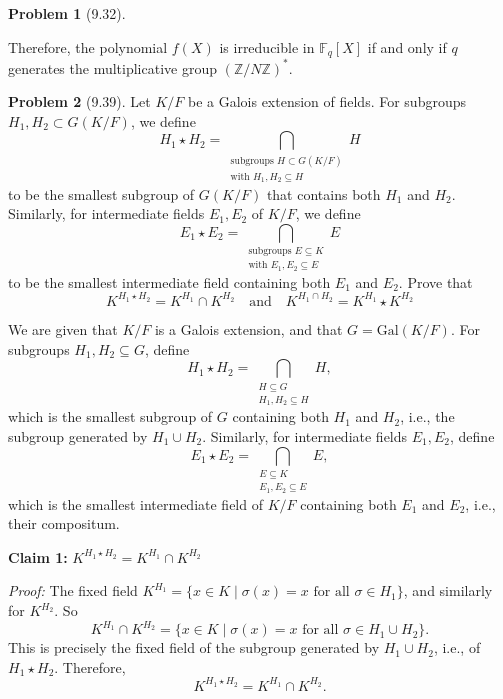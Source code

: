 \documentclass[12pt]{article}
\theoremstyle{definition}
\newtheorem{problem}{Problem}
\begin{document}
\begin{problem}[9.32]
\begin{enumerate}[label=(\alph*)]
\begin{solution}
            Therefore, the polynomial $f(X)$ is irreducible in $\mathbb{F}_q[X]$ if and only if $q$ generates the multiplicative group $(\mathbb{Z}/N\mathbb{Z})^*$.
        \end{solution}
    \end{enumerate}
\end{problem}


\begin{problem}[9.39]
    Let $K/F$ be a Galois extension of fields. For subgroups $H_1, H_2 \subset G(K/F)$, we define
    \[
        H_1 \star H_2 = \bigcap_{\substack{\text{subgroups } H \subset G(K/F)\\\text{with } H_1, H_2 \subseteq H}} H 
    \]
    to be the smallest subgroup of $G(K/F)$ that contains both $H_1$ and $H_2$. Similarly, for intermediate fields $E_1, E_2$ of $K/F$, we define
    \[
        E_1 \star E_2 = \bigcap_{\substack{\text{subgroups } E \subseteq K\\\text{with } E_1, E_2 \subseteq E}} E
    \]
    to be the smallest intermediate field containing both $E_1$ and $E_2$. Prove that
    \[
        K^{H_1 \star H_2} = K^{H_1} \cap K^{H_2} \quad \text{and} \quad K^{H_1 \cap H_2} = K^{H_1} \star K^{H_2}
    \]
    \begin{solution}
        We are given that \( K/F \) is a Galois extension, and that \( G = \text{Gal}(K/F) \). For subgroups \( H_1, H_2 \subseteq G \), define
        \[
        H_1 \star H_2 = \bigcap_{\substack{H \subseteq G\\ H_1, H_2 \subseteq H}} H,
        \]
        which is the smallest subgroup of \( G \) containing both \( H_1 \) and \( H_2 \), i.e., the subgroup generated by \( H_1 \cup H_2 \). Similarly, for intermediate fields \( E_1, E_2 \), define
        \[
        E_1 \star E_2 = \bigcap_{\substack{E \subseteq K\\ E_1, E_2 \subseteq E}} E,
        \]
        which is the smallest intermediate field of \( K/F \) containing both \( E_1 \) and \( E_2 \), i.e., their compositum.
        
        \textbf{Claim 1:} \( K^{H_1 \star H_2} = K^{H_1} \cap K^{H_2} \)
        
        \emph{Proof:} The fixed field \( K^{H_1} = \{ x \in K \mid \sigma(x) = x \text{ for all } \sigma \in H_1 \} \), and similarly for \( K^{H_2} \). So
        \[
        K^{H_1} \cap K^{H_2} = \{ x \in K \mid \sigma(x) = x \text{ for all } \sigma \in H_1 \cup H_2 \}.
        \]
        This is precisely the fixed field of the subgroup generated by \( H_1 \cup H_2 \), i.e., of \( H_1 \star H_2 \). Therefore,
        \[
        K^{H_1 \star H_2} = K^{H_1} \cap K^{H_2}.
        \]
        

\end{solution}
\end{problem}
\end{document}
